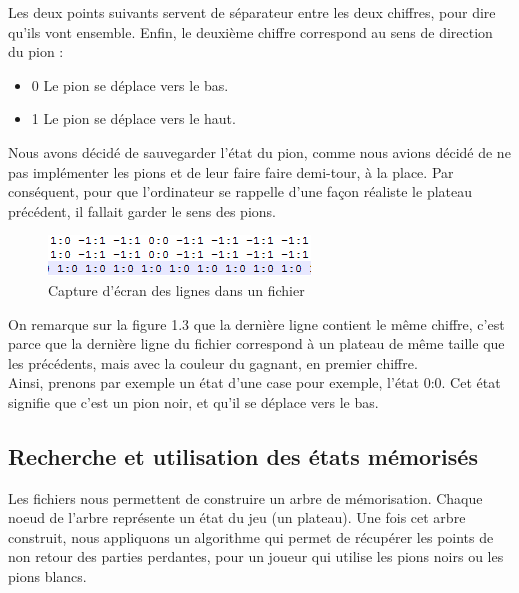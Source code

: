 \documentclass[a4paper, title page, 12pt]{report}
\begin{document}
	Les deux points suivants servent de séparateur entre les deux chiffres, pour dire qu'ils vont ensemble. Enfin, le deuxième chiffre correspond au sens de direction du pion : \\
	
	\begin{itemize}
	\item 0 Le pion se déplace vers le bas.
	\item 1 Le pion se déplace vers le haut.
	\end{itemize}
	\newpage
	Nous avons décidé de sauvegarder l'état du pion, comme nous avions décidé de ne pas implémenter les pions et de leur faire faire demi-tour, à la place. Par conséquent, pour que l'ordinateur se rappelle d'une façon réaliste le plateau précédent, il fallait garder le sens des pions.

	\begin{figure}[h]
\begin{center}
\includegraphics{img/screenshot_etats.png}
\end{center}
\caption{Capture d'écran des lignes dans un fichier}
\end{figure}	
	
	On remarque sur la figure 1.3 que la dernière ligne contient le même chiffre, c'est parce que la dernière ligne du fichier correspond à un plateau de même taille que les précédents, mais avec la couleur du gagnant, en premier chiffre.\\
	
	Ainsi, prenons par exemple un état d'une case pour exemple, l'état 0:0. Cet état signifie que c'est un pion noir, et qu'il se déplace vers le bas.\\
	\newpage
\subsection{Recherche et utilisation des états mémorisés}
Les fichiers nous permettent de construire un arbre de mémorisation. Chaque noeud de l'arbre représente un état du jeu (un plateau). Une fois cet arbre construit, nous appliquons un algorithme qui permet de récupérer les points de non retour des parties perdantes, pour un joueur qui utilise les pions noirs ou les pions blancs. \\
\end{document}
